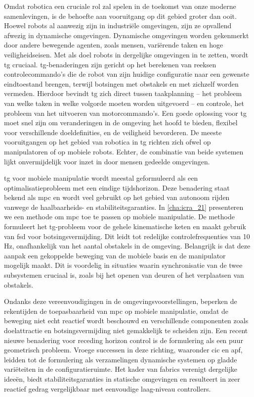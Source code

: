 Omdat robotica een cruciale rol zal spelen in de toekomst van onze moderne
samenlevingen, is de behoefte aan vooruitgang op dit gebied groter dan ooit.
Hoewel robots al aanwezig zijn in industriële omgevingen, zijn ze opvallend
afwezig in dynamische omgevingen. Dynamische omgevingen worden gekenmerkt door
andere bewegende agenten, zoals mensen, variërende taken en hoge
veiligheidseisen. Met als doel robots in dergelijke omgevingen in te zetten,
wordt \ac{tg} cruciaal. \Ac{tg}-benaderingen zijn gericht op het berekenen van
reeksen controlecommando's die de robot van zijn huidige configuratie naar een
gewenste eindtoestand brengen, terwijl botsingen met obstakels en met zichzelf
worden vermeden. Hierdoor bevindt \ac{tg} zich direct tussen taakplanning – het
probleem van welke taken in welke volgorde moeten worden uitgevoerd – en
controle, het probleem van het uitvoeren van motorcommando's. Een goede
oplossing voor \ac{tg} moet snel zijn om veranderingen in de omgeving het hoofd
te bieden, flexibel voor verschillende doeldefinities, en de veiligheid
bevorderen. De meeste vooruitgangen op het gebied van robotica in \ac{tg}
richten zich ofwel op manipulatoren of op mobiele robots. Echter, de combinatie
van beide systemen lijkt onvermijdelijk voor inzet in door mensen gedeelde
omgevingen.

\Ac{tg} voor mobiele manipulatie wordt meestal geformuleerd als een
optimalisatieprobleem met een eindige tijdshorizon. Deze benadering staat bekend
als \ac{mpc} en wordt veel gebruikt op het gebied van autonoom rijden vanwege de
haalbaarheids- en stabiliteitsgaranties. In \cref{cha:icra_21} presenteren we
een methode om \ac{mpc} toe te passen op mobiele manipulatie. De methode
formuleert het \ac{tg}-probleem voor de gehele kinematische keten en maakt
gebruik van \ac{fsd} voor botsingsvermijding. Dit leidt tot redelijke
controlefrequenties van 10 Hz, onafhankelijk van het aantal obstakels in de
omgeving. Belangrijk is dat deze aanpak een gekoppelde beweging van de mobiele
basis en de manipulator mogelijk maakt. Dit is voordelig in situaties waarin
synchronisatie van de twee subsystemen cruciaal is, zoals bij het openen van
deuren of het verplaatsen van obstakels.

Ondanks deze vereenvoudigingen in de omgevingsvoorstellingen, beperken de
rekentijden de toepasbaarheid van \ac{mpc} op mobiele manipulatie, omdat de
beweging niet echt reactief wordt beschouwd en verschillende componenten zoals
doelattractie en botsingsvermijding niet gemakkelijk te scheiden zijn. Een
recent nieuwe benadering voor receding horizon control is de formulering als een
puur geometrisch probleem. Vroege successen in deze richting, waaronder \ac{cic}
en \ac{apf}, leidden tot de formulering als verzamelingen dynamische systemen op
gladde variëteiten in de configuratieruimte. Het kader van \acf{fabrics}
verenigt dergelijke ideeën, biedt stabiliteitsgaranties in statische omgevingen
en resulteert in zeer reactief gedrag vergelijkbaar met eenvoudige laag-niveau
controllers.

